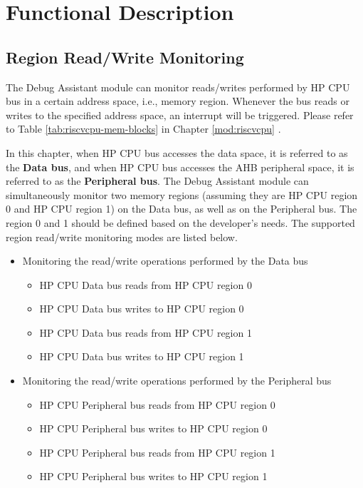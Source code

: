 \documentclass[main\_\_EN.tex]{subfiles}
\begin{document}
\section{Functional Description}
\label{sec:dbgassist-func-descr}

\subsection{Region Read/Write Monitoring}

The Debug Assistant module can monitor reads/writes performed by HP CPU bus in a certain address space, i.e., memory region. Whenever the bus reads or writes to the specified address space, an interrupt will be triggered. Please refer to Table \ref{tab:riscvcpu-mem-blocks} in Chapter \ref{mod:riscvcpu} \textit{}.

In this chapter, when HP CPU bus accesses the data space, it is referred to as the \textbf{Data bus}, and when HP CPU bus accesses the AHB peripheral space, it is referred to as the \textbf{Peripheral bus}. The Debug Assistant module can simultaneously monitor two memory regions (assuming they are HP CPU region 0 and HP CPU region 1) on the Data bus, as well as on the Peripheral bus. The region 0 and 1 should be defined based on the developer's needs. 
The supported region read/write monitoring modes are listed below.

\begin{itemize}
    \item Monitoring the read/write operations performed by the Data bus
        \begin{itemize}
            \item HP CPU Data bus reads from HP CPU region 0
            \item HP CPU Data bus writes to HP CPU region 0
            \item HP CPU Data bus reads from HP CPU region 1
            \item HP CPU Data bus writes to HP CPU region 1
        \end{itemize}    
    \item Monitoring the read/write operations performed by the Peripheral bus
        \begin{itemize}
            \item HP CPU Peripheral bus reads from HP CPU region 0
            \item HP CPU Peripheral bus writes to HP CPU region 0
            \item HP CPU Peripheral bus reads from HP CPU region 1
            \item HP CPU Peripheral bus writes to HP CPU region 1
        \end{itemize}
\end{itemize}
\end{document}
